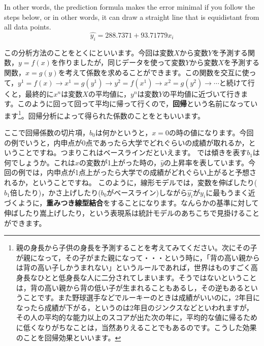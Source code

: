 \documentclass{ltjbook}
\begin{document}
In other words, the prediction formula makes the error minimal if you follow the steps below, or in other words, it can draw a straight line that is equidistant from all data points.
\[ \hat{y_i} = 288.7371 + 93.71779 x_i \]

この分析方法のことをとくにといいます。今回は変数$X$から変数$Y$を予測する関数，$y=f(x)$を作りましたが，同じデータを使って変数$Y$から変数$X$を予測する関数，$x=g(y)$を考えて係数を求めることができます。この関数を交互に使って，$y^1 = f(x) \to x^1 = g(y^1) \to y^2 = f(x^1) \to x^2 = g(y^2) \to \cdots $と続けて行くと，最終的に$x^n$は変数$X$の平均値に，$y^n$は変数$Y$の平均値に近づいて行きます。このように回って回って平均に帰って行くので，\textbf{回帰}という名前になっています\footnote{親の身長から子供の身長を予測することを考えてみてください。次にその子が親になって，その子がまた親になって・・・という時に，「背の高い親からは背の高い子しかうまれない」というルールであれば，世界はものすごく高身長なひとと低身長な人に二分されてしまいます。そうではないということは，背の高い親から背の低い子が生まれることもあるし，その逆もあるということです。また野球選手などでルーキーのときは成績がいいのに，2年目になったら成績が下がる，というのは2年目のジンクスなどといわれますが，その人の平均的な能力以上のスコアが出た次の年に，平均的な値に帰るために低くなりがちなことは，当然ありえることでもあるのです。こうした効果のことを回帰効果といいます。}。回帰分析によって得られた係数のことをともいいます。

ここで回帰係数の切片項，$b_0$は何かというと，$x=0$の時の値になります。今回の例でいうと，内申点が0点であったら大学でどれぐらいの成績が取れるか，ということですね。つまりこれはベースラインだといえます。
では傾きを表す$b_1$は何でしょうか。これは$x$の変数が1上がった時の，$\hat{y}$の上昇率を表しています。今回の例では，内申点が1点上がったら大学での成績がどれぐらい上がると予想されるか，ということですね。
このように，線形モデルでは，変数を伸ばしたり($b_1$倍したり)，かさ上げしたり($b_0$がベースライン)しながら$\hat{y_i}$が$y_i$に最もうまく近づくように，\textbf{重みつき線型結合}をすることになります。なんらかの基準に対して伸ばしたり嵩上げしたり，という表現系は統計モデルのあちこちで見掛けることができます。
\end{document}
